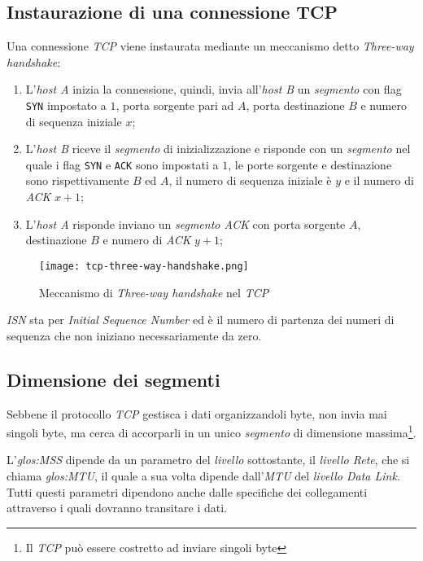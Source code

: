 \subsection{Instaurazione di una connessione TCP}
Una connessione \emph{TCP} viene instaurata mediante un meccanismo detto
\emph{Three-way handshake}:
\begin{enumerate}
    \item L'\emph{host A} inizia la connessione, quindi, invia all'\emph{host B}
    un \emph{segmento} con flag \texttt{SYN} impostato a $1$, porta sorgente pari
    ad $A$, porta destinazione $B$ e numero di sequenza iniziale $x$;
    \item L'\emph{host B} riceve il \emph{segmento} di inizializzazione e risponde
    con un \emph{segmento} nel quale i flag \texttt{SYN} e \texttt{ACK} sono
    impostati a $1$, le porte sorgente e destinazione sono rispettivamente $B$
    ed $A$, il numero di sequenza iniziale è $y$ e il numero di \emph{ACK} $x+1$;
    \item L'\emph{host A} risponde inviano un \emph{segmento ACK} con porta
    sorgente $A$, destinazione $B$ e numero di \emph{ACK} $y+1$;
\end{enumerate}
\begin{figure}[h!]
    \centering
    \texttt{[image: tcp-three-way-handshake.png]}
    \caption{Meccanismo di \emph{Three-way handshake} nel \emph{TCP}}
\end{figure}
\begin{note}
    \emph{ISN} sta per \emph{Initial Sequence Number} ed è il numero di
    partenza dei numeri di sequenza che non iniziano necessariamente da
    zero.
\end{note}

\subsection{Dimensione dei segmenti}
Sebbene il protocollo \emph{TCP} gestisca i dati organizzandoli byte, non invia
mai singoli byte, ma cerca di accorparli in un unico \emph{segmento} di dimensione
massima\footnote{Il \emph{TCP} può essere costretto ad inviare singoli byte}.

L'\emph{\gls{glos:MSS}} dipende da un parametro del \emph{livello} sottostante,
il \emph{livello Rete}, che si chiama \emph{\gls{glos:MTU}}, il quale a sua
volta dipende dall'\emph{MTU} del \emph{livello Data Link}. Tutti questi parametri
dipendono anche dalle specifiche dei collegamenti attraverso i quali dovranno
transitare i dati.

